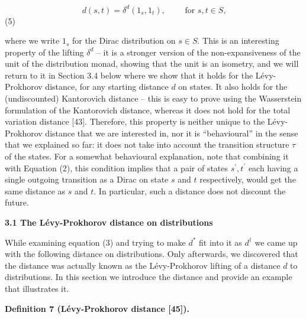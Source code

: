 \par  \quad  \[d(s,t)=\delta^{d}(1_{s},1_{t}),\qquad\mbox{ for $s,t\in S$,}\]\quad  \quad  (5)\quad  
  
where we write $1_{s}$ for the Dirac distribution on $s\in S$. This is an interesting property of the lifting $\delta^{d}$ – it is a stronger version of the non-expansiveness of the unit of the distribution monad, showing that the unit is an isometry, and we will return to it in Section 3.4 below where we show that it holds for the Lévy-Prokhorov distance, for any starting distance $d$ on states. It also holds for the (undiscounted) Kantorovich distance – this is easy to prove using the Wasserstein formulation of the Kantorovich distance, whereas it does not hold for the total variation distance [43]. Therefore, this property is neither unique to the Lévy-Prokhorov distance that we are interested in, nor it is “behavioural” in the sense that we explained so far: it does not take into account the transition structure $\tau$ of the states. For a somewhat behavioural explanation, note that combining it with Equation (2), this condition implies that a pair of states $s^{\prime},t^{\prime}$ each having a single outgoing transition as a Dirac on state $s$ and $t$ respectively, would get the same distance as $s$ and $t$. In particular, such a distance does not discount the future.\par
 
 
 
 
\par\medskip\noindent\textbf{3.1 The Lévy-Prokhorov distance on distributions}\par
 
 
While examining equation (3) and trying to make $d^{*}$ fit into it as $d^{\dagger}$ we came up with the following distance on distributions. Only afterwards, we discovered that the distance was actually known as the Lévy-Prokhorov lifting of a distance $d$ to distributions. In this section we introduce the distance and provide an example that illustrates it.\par
 
 
 
\par\medskip\noindent\textbf{Definition 7 (Lévy-Prokhorov distance [45]).}\par
 

